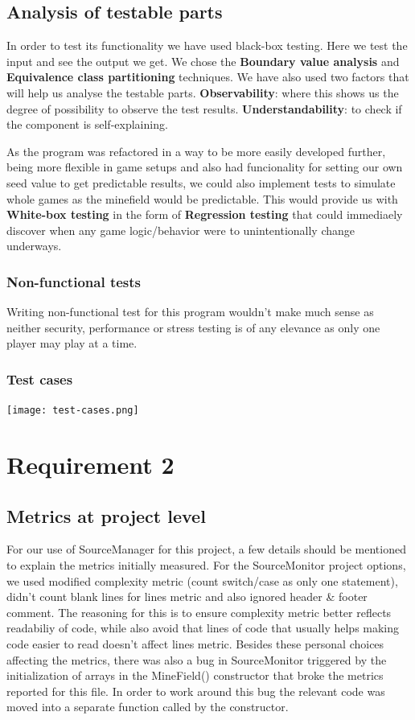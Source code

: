 \documentclass[UKenglish]{article}  %
\begin{document}
\subsection{Analysis of testable parts}
In order to test its functionality we have used black-box testing. Here we test
the input and see the output we get. We chose the \textbf{Boundary value analysis}
and \textbf{Equivalence class partitioning} techniques.
We have also used two factors that will help us analyse the testable parts.
\textbf{Observability}: where this shows us the degree of possibility to observe the
test results.
\textbf{Understandability}: to check if the component is self-explaining. 

As the program was refactored in a way to be more easily developed further,
being more flexible in game setups and also had funcionality for setting
our own seed value to get predictable results, we could also implement
tests to simulate whole games as the minefield would be predictable.
This would provide us with \textbf{White-box testing} in the form of
\textbf{Regression testing} that could immediaely discover when any game
logic/behavior were to unintentionally change underways.

\subsubsection{Non-functional tests}
Writing non-functional test for this program wouldn't make much sense as
neither security, performance or stress testing is of any elevance as only
one player may play at a time.

\subsubsection{Test cases}
\texttt{[image: test-cases.png]}


\section{Requirement 2}

\subsection{Metrics at project level}
For our use of SourceManager for this project, a few details should be
mentioned to explain the metrics initially measured.
For the SourceMonitor project options, we used modified complexity metric
(count switch/case as only one statement), didn't count blank lines for lines
metric and also ignored header \& footer comment.
The reasoning for this is to ensure complexity metric better reflects
readabiliy of code, while also avoid that lines of code that usually helps
making code easier to read doesn't affect lines metric.
Besides these personal choices affecting the metrics, there was also a bug
in SourceMonitor triggered by the initialization of arrays in the MineField()
constructor that broke the metrics reported for this file. In order to work
around this bug the relevant code was moved into a separate function called by
the constructor.
\end{document}

